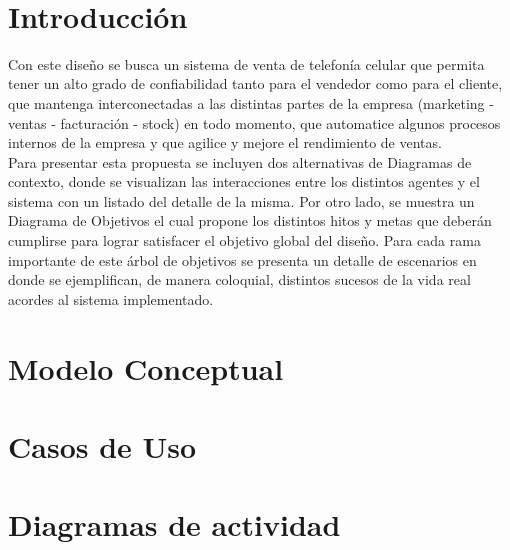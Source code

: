 ‌\section{Introducción}
Con este diseño se busca un sistema de venta de telefonía celular que permita tener un alto grado de confiabilidad tanto para el vendedor como para el cliente, que mantenga interconectadas a las distintas partes de la empresa (marketing - ventas - facturación - stock) en todo momento, que automatice algunos procesos internos de la empresa y que agilice y mejore el rendimiento de ventas.\\
\indent Para presentar esta propuesta se incluyen dos alternativas de Diagramas de contexto, donde se visualizan las interacciones entre los distintos agentes y el sistema con un listado del detalle de la misma. Por otro lado, se muestra un Diagrama de Objetivos el cual propone los distintos hitos y metas que deberán cumplirse para lograr satisfacer el objetivo global del diseño. Para cada rama importante de este árbol de objetivos se presenta un detalle de escenarios en donde se ejemplifican, de manera coloquial, distintos sucesos de la vida real acordes al sistema implementado.\\

\section{Modelo Conceptual}

\clearpage

\section{Casos de Uso}

\clearpage

\section{Diagramas de actividad}

\clearpage

